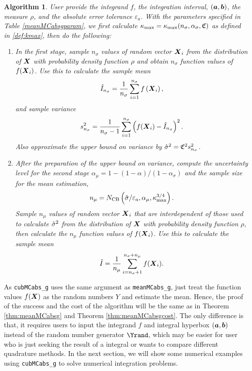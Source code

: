 \documentclass{iitthesis}
\newtheorem{algorithm}[theorem]{Algorithm}
\theoremstyle{definition}
\begin{document}
\begin{algorithm}\label{alg:cubMCabsg} 
User provide the integrand $f$, the integration interval, $(\boldsymbol{a},\boldsymbol{b})$, the measure $\rho$, and the absolute error tolerance $\varepsilon_a$. With the parameters specified in Table \ref{meanMCabsgparam}, we first calculate $\kappa_{\max}=\kappa_{\max}(n_\sigma,\alpha_\sigma,\mathfrak{C})$ as defined in \eqref{def:kmax}, then do the following:
\begin{enumerate}
\item In the first stage, sample $n_\sigma$ values of random vector $\boldsymbol{X}_i$ from the distribution of $\boldsymbol{X}$ with probability density function $\rho$ and obtain $n_\sigma$ function values of $f(\boldsymbol{X}_i)$. Use this to calculate the sample mean $$\hat{I}_{n_\sigma} = \frac{1}{n_\sigma}\sum_{i=1}^{n_\sigma} f\left(\boldsymbol{X}_i\right),$$ and sample variance $$s_{n_\sigma}^2 = \frac{1}{n_\sigma-1}\sum_{i=1}^{n_\sigma} \left(f(\boldsymbol{X}_i)-\hat{I}_{n_\sigma}\right)^2.$$ Also approximate the upper bound on variance by $\hat{\sigma}^2 = \mathfrak{C}^2 s^2_{n_\sigma}$. 

\item After the preparation of the upper bound on variance, compute the uncertainty level for the second stage $\alpha_\mu = 1-(1-\alpha)/(1-\alpha_{\sigma})$ and the sample size for the mean estimation,
\begin{align}
n_\mu = N_{\text{CB}} \left(\hat{\sigma}/\varepsilon_a,\alpha_\mu, \kappa_{\max}^{3/4}\right).
\end{align}
Sample $n_\mu$ values of random vector $\boldsymbol{X}_i$ that are interdependent of those used to calculate $\hat{\sigma}^2$ from the distribution of $\boldsymbol{X}$ with probability density function $\rho$, then calculate the $n_\mu$ function values of $f(\boldsymbol{X}_i)$. Use this to calculate the sample mean 
\begin{align}\label{hmun}
\hat{I}= \frac{1}{n_\mu}\sum_{i = n_\sigma+1}^{n_\sigma+n_\mu}f(\boldsymbol{X}_i).
\end{align}
\end{enumerate}
\end{algorithm}
As {\tt cubMCabs\_g} uses the same argument as {\tt meanMCabs\_g}, just treat the function values $f(\boldsymbol{X}) $ as the random numbers $Y$ and estimate the mean. Hence, the proof of the success and the cost of the algorithm will be the same as in Theorem \ref{thm:meanMCabsg} and Theorem \ref{thm:meanMCabsgcost}. The only difference is that, it requires users to input the integrand $f$ and integral hyperbox $(\boldsymbol{a},\boldsymbol{b})$ instead of the random number generator $\Yrand$, which may be easier for user who is just seeking the result of a integral or wants to compare different quadrature methods. In the next section, we will show some numerical examples using {\tt cubMCabs\_g} to solve numerical integration problems.
\end{document}
